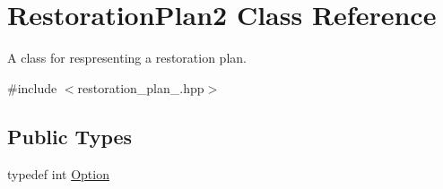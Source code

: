 \hypertarget{class_restoration_plan2}{}\section{Restoration\+Plan2 Class Reference}
\label{class_restoration_plan2}


A class for respresenting a restoration plan.  




{\ttfamily \#include $<$restoration\+\_\+plan\+\_.\+hpp$>$}

\subsection*{Public Types}
\begin{DoxyCompactItemize}
\item 
typedef int \hyperlink{class_restoration_plan2_aff164a2726831342bf87af5e11df1064}{Option}
\end{DoxyCompactItemize}
